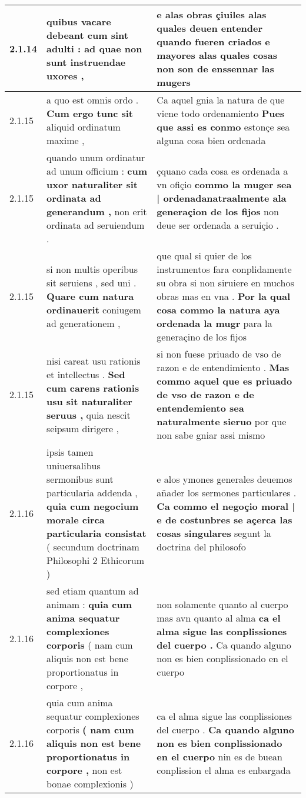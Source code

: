 \begin{tabular}{|p{1cm}|p{6.5cm}|p{6.5cm}|}
2.1.14 & quibus vacare debeant \textbf{ cum sint adulti : } ad quae non sunt instruendae uxores , & e alas obras çiuiles alas quales deuen entender \textbf{ quando fueren criados } e mayores alas quales cosas non son de enssennar las mugers \\\hline
2.1.15 & a quo est omnis ordo . \textbf{ Cum ergo tunc sit } aliquid ordinatum maxime , & Ca aquel gnia la natura de que viene todo ordenamiento \textbf{ Pues que assi es conmo } estonçe sea alguna cosa bien ordenada \\\hline
2.1.15 & quando unum ordinatur ad unum officium : \textbf{ cum uxor naturaliter sit ordinata ad generandum , } non erit ordinata ad seruiendum . & çquano cada cosa es ordenada a vn ofiçio \textbf{ commo la muger sea | ordenadanatraalmente ala generaçion de los fijos } non deue ser ordenada a seruiçio . \\\hline
2.1.15 & si non multis operibus sit seruiens , sed uni . \textbf{ Quare cum natura ordinauerit } coniugem ad generationem , & que qual si quier de los instrumentos fara conplidamente su obra si non siruiere en muchos obras mas en vna . \textbf{ Por la qual cosa commo la natura aya ordenada la mugr } para la generaçino de los fijos \\\hline
2.1.15 & nisi careat usu rationis et intellectus . \textbf{ Sed cum carens rationis usu sit naturaliter seruus , } quia nescit seipsum dirigere , & si non fuese priuado de vso de razon e de entendimiento . \textbf{ Mas commo aquel que es priuado de vso de razon e de entendemiento sea naturalmente sieruo } por que non sabe gniar assi mismo \\\hline
2.1.16 & ipsis tamen uniuersalibus sermonibus sunt particularia addenda , \textbf{ quia cum negocium morale circa particularia consistat } ( secundum doctrinam Philosophi 2 Ethicorum ) & e alos ymones generales deuemos añader los sermones particulares . \textbf{ Ca commo el negoçio moral | e de costunbres se açerca las cosas singulares } segunt la doctrina del philosofo \\\hline
2.1.16 & sed etiam quantum ad animam : \textbf{ quia cum anima sequatur complexiones corporis } ( nam cum aliquis non est bene proportionatus in corpore , & non solamente quanto al cuerpo mas avn quanto al alma \textbf{ ca el alma sigue las conplissiones del cuerpo . } Ca quando alguno non es bien conplissionado en el cuerpo \\\hline
2.1.16 & quia cum anima sequatur complexiones corporis \textbf{ ( nam cum aliquis non est bene proportionatus in corpore , } non est bonae complexionis ) & ca el alma sigue las conplissiones del cuerpo . \textbf{ Ca quando alguno non es bien conplissionado en el cuerpo } nin es de buean conplission el alma es enbargada \\\hline

\end{tabular}
